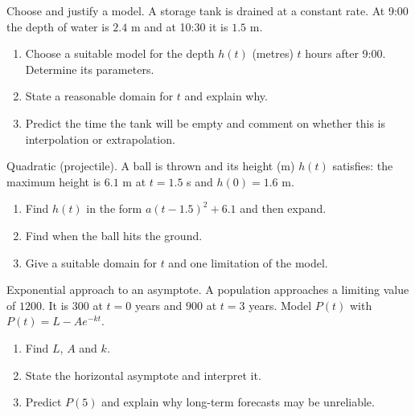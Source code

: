 \documentclass[11pt]{article}
\def\textbf#1{#1}%
\newcounter{question}
\begin{document}
\begin{question}
\textbf{Choose and justify a model.}
A storage tank is drained at a constant rate. At 9:00 the depth of water is $2.4$ m and at 10:30 it is $1.5$ m.
\begin{enumerate}
  \item Choose a suitable model for the depth $h(t)$ (metres) $t$ hours after 9:00. Determine its parameters.
  \item State a reasonable domain for $t$ and explain why.
  \item Predict the time the tank will be empty and comment on whether this is interpolation or extrapolation.
\end{enumerate}
\end{question}

\begin{question}
\textbf{Quadratic (projectile).}
A ball is thrown and its height (m) $h(t)$ satisfies: the maximum height is $6.1$ m at $t=1.5$ s and $h(0)=1.6$ m.
\begin{enumerate}
  \item Find $h(t)$ in the form $a(t-1.5)^2+6.1$ and then expand.
  \item Find when the ball hits the ground.
  \item Give a suitable domain for $t$ and one limitation of the model.
\end{enumerate}

\begin{center}
\end{center}
\end{question}

\begin{question}
\textbf{Exponential approach to an asymptote.}
A population approaches a limiting value of $1200$. It is $300$ at $t=0$ years and $900$ at $t=3$ years.
Model $P(t)$ with $P(t)=L-Ae^{-kt}$.
\begin{enumerate}
  \item Find $L$, $A$ and $k$.
  \item State the horizontal asymptote and interpret it.
  \item Predict $P(5)$ and explain why long-term forecasts may be unreliable.
\end{enumerate}
\end{question}
\end{document}
